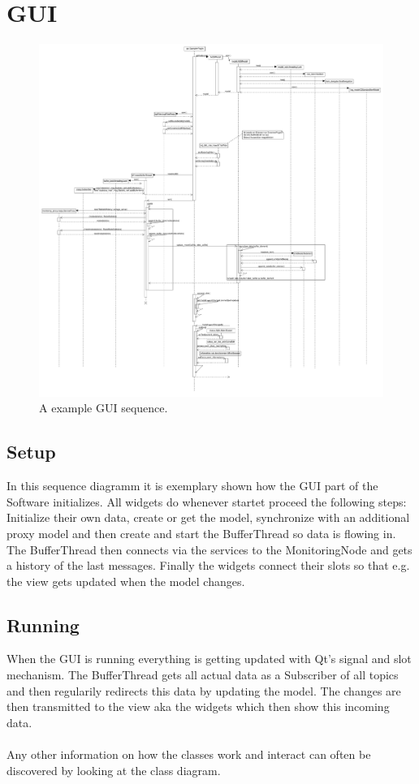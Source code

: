 \section{GUI}
\begin{figure}[!ht]
	\begin{center}
		\includegraphics[width=1.0\linewidth]{./diagram_pictures/GUI_seq.pdf}
		\caption{A example GUI sequence.}
	\end{center}
\end{figure}
\subsection*{Setup}
In this sequence diagramm it is exemplary shown how the GUI part of the Software initializes.
All widgets do whenever startet proceed the following steps: Initialize their own data, create or get the model, synchronize with an additional proxy model and then create and start the BufferThread so data is flowing in. The BufferThread then connects via the services to the MonitoringNode and gets a history of the last messages.
Finally the widgets connect their slots so that e.g. the view gets updated when the model changes.
\subsection*{Running}
When the GUI is running everything is getting updated with Qt's signal and slot mechanism. The BufferThread gets all actual data as a Subscriber of all topics and then regularily redirects this data by updating the model. The changes are then transmitted to the view aka the widgets which then show this incoming data.
\\
\\Any other information on how the classes work and interact can often be discovered by looking at the class diagram.